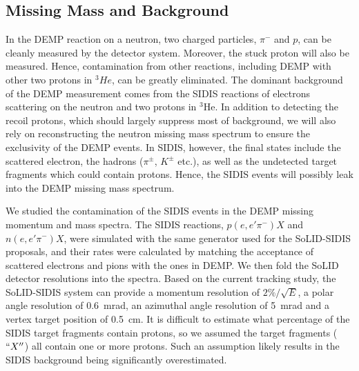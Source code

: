 \subsection{Missing Mass and Background}

In the DEMP reaction on a neutron, two charged particles, $\pi^{-}$ and $p$,
can be cleanly measured by the detector system.  Moreover, the stuck proton
will also be measured.  Hence, contamination from other reactions, including
DEMP with other two protons in $^{3}He$, can be greatly eliminated.  The
dominant background of the DEMP measurement comes from the SIDIS reactions of
electrons scattering on the neutron and two protons in $\mathrm{^{3}He}$. In
addition to detecting the recoil protons, which should largely suppress most of
background, we will also rely on reconstructing the neutron missing mass
spectrum to ensure the exclusivity of the DEMP events. In SIDIS, however, the
final states include the scattered electron, the hadrons ($\pi^{\pm}$,
$K^{\pm}$ etc.), as well as the undetected target fragments which could contain
protons. Hence, the SIDIS events will possibly leak into the DEMP missing mass
spectrum.

We studied the contamination of the SIDIS events in the DEMP missing momentum
and mass spectra. The SIDIS reactions, $p(e,e'\pi^{-})X$ and $n(e,e'\pi^{-})X$,
were simulated with the same generator used for the SoLID-SIDIS proposals, and
their rates were calculated by matching the acceptance of scattered electrons
and pions with the ones in DEMP. We then fold the SoLID detector resolutions
into the spectra. Based on the current tracking study, the SoLID-SIDIS system
can provide a momentum resolution of $2\%/\sqrt{E}$, a polar angle
resolution of 0.6~mrad, an azimuthal angle resolution of 5~mrad and a
vertex target position of 0.5~cm. It is difficult to estimate what
percentage of the SIDIS target fragments contain protons, so we assumed
the target fragments ($``X''$) all contain one or more protons. Such an
assumption likely results in the SIDIS background being significantly
overestimated.

